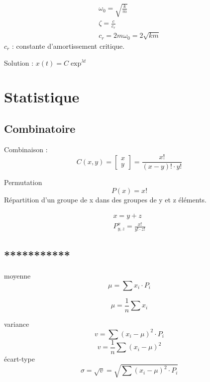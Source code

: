 	\begin{eqnarray}
	\omega_0=\sqrt{\frac{k}{m}}\\
	\zeta=\frac{c}{c_r}\\
	c_r=2 m \omega_0=2\sqrt{km}
	\end{eqnarray}
	$c_r$ : constante d'amortissement critique. 
	
	Solution : $x(t)=C \exp^{\lambda t}$
	
	\newpage
	\section{Statistique}
	\subsection{Combinatoire}
	Combinaison : 
	\begin{equation}
	C(x,y)=\begin{bmatrix}
	x\\
	y
	\end{bmatrix}=\frac{x!}{(x-y)!\cdot y!}
	\end{equation}
	
	
	Permutation
	\begin{equation}
	P(x)=x!
	\end{equation}
	Répartition d'un groupe de x dans des groupes de y et z éléments.
	
	\begin{eqnarray}
	x=y+z\\
	P^x_{y,z}=\frac{x!}{y! \cdot z!}
	\end{eqnarray}
	\subsection{***********}
	
	moyenne
	\begin{equation}
	\mu=\sum x_i \cdot P_i
	\end{equation}
	
	\begin{equation}
	\mu = \frac{1}{n}\sum x_i
	\end{equation}
	
	variance
	\begin{equation}
	v=\sum (x_i-\mu)^2\cdot P_i
	\end{equation}
	\begin{equation}
	v=\frac{1}{n} \sum (x_i-\mu)^2
	\end{equation}
	écart-type
	\begin{equation}
	\sigma=\sqrt{v}=\sqrt{\sum (x_i-\mu)^2\cdot P_i}
	\end{equation}
	
